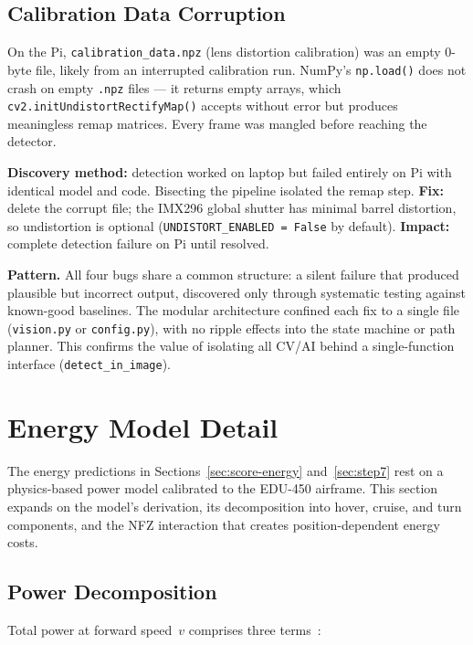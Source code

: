 \documentclass[10pt,a4paper]{article}
\begin{document}
\subsection{Calibration Data Corruption}

On the Pi, \texttt{calibration\_data.npz} (lens distortion calibration) was an empty 0-byte file, likely from an interrupted calibration run. NumPy's \texttt{np.load()} does not crash on empty \texttt{.npz} files --- it returns empty arrays, which \texttt{cv2.initUndistortRectifyMap()} accepts without error but produces meaningless remap matrices. Every frame was mangled before reaching the detector.

\textbf{Discovery method:} detection worked on laptop but failed entirely on Pi with identical model and code. Bisecting the pipeline isolated the remap step. \textbf{Fix:} delete the corrupt file; the IMX296 global shutter has minimal barrel distortion, so undistortion is optional (\texttt{UNDISTORT\_ENABLED = False} by default). \textbf{Impact:} complete detection failure on Pi until resolved.

\medskip
\noindent\textbf{Pattern.} All four bugs share a common structure: a silent failure that produced plausible but incorrect output, discovered only through systematic testing against known-good baselines. The modular architecture confined each fix to a single file (\texttt{vision.py} or \texttt{config.py}), with no ripple effects into the state machine or path planner. This confirms the value of isolating all CV/AI behind a single-function interface (\texttt{detect\_in\_image}).


\section{Energy Model Detail}\label{sec:energy-detail}

The energy predictions in Sections~\ref{sec:score-energy} and~\ref{sec:step7} rest on a physics-based power model calibrated to the EDU-450 airframe. This section expands on the model's derivation, its decomposition into hover, cruise, and turn components, and the NFZ interaction that creates position-dependent energy costs.

\subsection{Power Decomposition}

Total power at forward speed~$v$ comprises three terms~\citep{johnson2013helicopter}:
\end{document}
